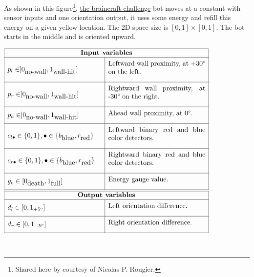 \documentclass[a4]{article} \usepackage[left=2cm,right=3cm,top=1cm,bottom=2cm]{geometry}
\newcommand{\eqline}[1]{~\vspace{0.1cm}\\\centerline{$#1$}\vspace{0.1cm}\\}
\begin{document}
As shown in this figure\footnote{Shared here by courtesy of Nicolas P. Rougier.}, \href{https://github.com/rougier/braincraft}{the braincraft challenge} bot moves at a constant with sensor inputs and one orientation output, it uses some energy and refill this energy on a given yellow location. The 2D space size is $[0, 1] \times [0, 1]$. The bot starts in the middle and is oriented upward.
\eqline{\begin{array}{|ll|l|}
  \hline\multicolumn{3}{|c|}{\mbox{{\bf Input variables}}}\\\hline
  p_l \in ]0_{\mbox{no-wall}}, 1_{\mbox{wall-hit}}] && \mbox{\parbox{5cm}{~\\Leftward wall proximity, at +30° on the left.\\}} \\\hline 
  p_r \in ]0_{\mbox{no-wall}}, 1_{\mbox{wall-hit}}] && \mbox{\parbox{5cm}{~\\Rightward wall proximity, at -30° on the  right.\\}} \\\hline 
  p_a \in ]0_{\mbox{no-wall}}, 1_{\mbox{wall-hit}}] && \mbox{\parbox{5cm}{~\\Ahead wall proximity, at 0°.\\}} \\\hline 
  c_{l\bullet} \in \{0, 1\}, \bullet \in \{b_{\mbox{blue}}, r_{\mbox{red}}\} && \mbox{\parbox{5cm}{~\\Leftward binary red and blue color detectors.\\}}\\\hline 
  c_{r\bullet}  \in \{0, 1\}, \bullet \in \{b_{\mbox{blue}}, r_{\mbox{red}}\} && \mbox{\parbox{5cm}{~\\Rightward binary red and blue color detectors.\\}} \\\hline 
  g_e \in [0_{\mbox{death}}, 1_{\mbox{full}}] && \mbox{\parbox{5cm}{~\\Energy gauge value.\\}} \\\hline 
  \hline \multicolumn{3}{|c|}{\mbox{{\bf Output variables}}}\\\hline
  d_l \in [0, 1_{+ 5^o}] && \mbox{\parbox{5cm}{~\\Left orientation difference.\\}}\\\hline 
  d_r \in [0, 1_{- 5^o}] && \mbox{\parbox{5cm}{~\\Right orientation difference.\\}}\\\hline 
 \end{array}}
\end{document}
